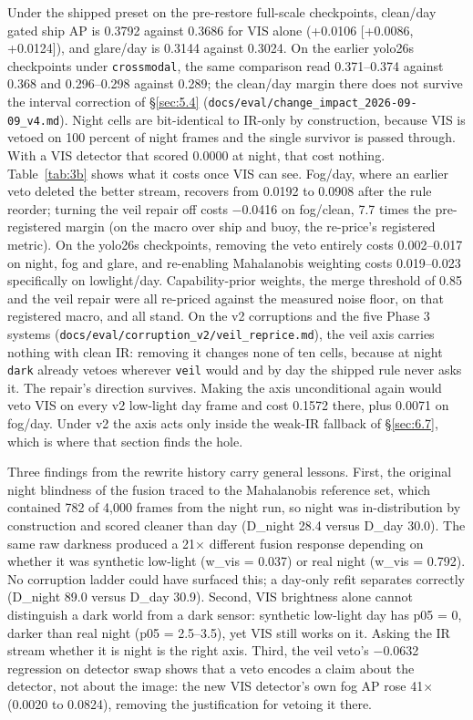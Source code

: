 \documentclass[10pt]{article}
\begin{document}
Under the shipped preset on the pre-restore full-scale checkpoints, clean/day gated ship AP is 0.3792 against 0.3686 for VIS alone (+0.0106 [+0.0086, +0.0124]), and glare/day is 0.3144 against 0.3024. On the earlier yolo26s checkpoints under \texttt{crossmodal}, the same comparison read 0.371--0.374 against 0.368 and 0.296--0.298 against 0.289; the clean/day margin there does not survive the interval correction of \S\ref{sec:5.4} (\texttt{docs/\allowbreak{}eval/\allowbreak{}change\_\allowbreak{}impact\_\allowbreak{}2026-09-09\_\allowbreak{}v4.md}). Night cells are bit-identical to IR-only by construction, because VIS is vetoed on 100 percent of night frames and the single survivor is passed through. With a VIS detector that scored 0.0000 at night, that cost nothing. Table~\ref{tab:3b} shows what it costs once VIS can see. Fog/day, where an earlier veto deleted the better stream, recovers from 0.0192 to 0.0908 after the rule reorder; turning the veil repair off costs $-$0.0416 on fog/clean, 7.7 times the pre-registered margin (on the macro over ship and buoy, the re-price's registered metric). On the yolo26s checkpoints, removing the veto entirely costs 0.002--0.017 on night, fog and glare, and re-enabling Mahalanobis weighting costs 0.019--0.023 specifically on lowlight/day. Capability-prior weights, the merge threshold of 0.85 and the veil repair were all re-priced against the measured noise floor, on that registered macro, and all stand. On the v2 corruptions and the five Phase 3 systems (\texttt{docs/\allowbreak{}eval/\allowbreak{}corruption\_\allowbreak{}v2/\allowbreak{}veil\_\allowbreak{}reprice.md}), the veil axis carries nothing with clean IR: removing it changes none of ten cells, because at night \texttt{dark} already vetoes wherever \texttt{veil} would and by day the shipped rule never asks it. The repair's direction survives. Making the axis unconditional again would veto VIS on every v2 low-light day frame and cost 0.1572 there, plus 0.0071 on fog/day. Under v2 the axis acts only inside the weak-IR fallback of \S\ref{sec:6.7}, which is where that section finds the hole.

Three findings from the rewrite history carry general lessons. First, the original night blindness of the fusion traced to the Mahalanobis reference set, which contained 782 of 4,000 frames from the night run, so night was in-distribution by construction and scored cleaner than day (D\_night 28.4 versus D\_day 30.0). The same raw darkness produced a 21$\times$ different fusion response depending on whether it was synthetic low-light (w\_vis = 0.037) or real night (w\_vis = 0.792). No corruption ladder could have surfaced this; a day-only refit separates correctly (D\_night 89.0 versus D\_day 30.9). Second, VIS brightness alone cannot distinguish a dark world from a dark sensor: synthetic low-light day has p05 = 0, darker than real night (p05 = 2.5--3.5), yet VIS still works on it. Asking the IR stream whether it is night is the right axis. Third, the veil veto's $-$0.0632 regression on detector swap shows that a veto encodes a claim about the detector, not about the image: the new VIS detector's own fog AP rose 41$\times$ (0.0020 to 0.0824), removing the justification for vetoing it there.
\end{document}
